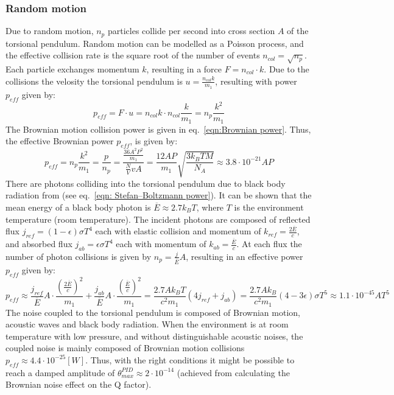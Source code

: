 \documentclass[\main/master.tex]{subfiles}
\begin{document}
\subsubsection{Random motion}
Due to random motion, $n_p$ particles collide per second into cross section $A$ of the torsional pendulum. Random motion can be modelled as a Poisson process, and the effective collision rate is the square root of the number of events $n_{col} = \sqrt{n_p}$. Each particle exchanges momentum $k$, resulting in a force $F = n_{col}\cdot k$. Due to the collisions the velosity the torsional pendulum is $ u = \frac{n_{col}k}{m_1}$, resulting with power $p_{eff}$ given by:
\begin{equation}
p_{eff} = F\cdot u =  n_{col}k \cdot n_{col}\frac{k}{m_1} =  n_p\frac{ k^2}{m_1}
\label{eqn:net power}
\end{equation}
The Brownian motion collision power is given in eq.~\ref{eqn:Brownian power}. Thus, the effective Brownian power $p_{eff}$, is given by:
\begin{equation}
p_{eff} =  n_p\frac{ k^2}{m_1} = \frac{p}{n_p} = \frac{\frac{36A^2P^2}{m_1}}{\frac{N}{V}v A} = \frac{12AP}{m_1}\sqrt{\frac{3 k_B T M}{ N_A }}\approx 3.8\cdot 10^{-21}AP
\label{eqn:Brownian net power}
\end{equation}
There are photons colliding into the torsional pendulum due to black body radiation from (see eq.~\ref{eqn: Stefan–Boltzmann power}). It can be shown that the mean energy of a black body photon is $\overline{E}\approx 2.7k_B T$, where $T$ is the environment temperature (room temperature). The incident photons are composed of reflected flux $j_{ref}=(1-\epsilon)\sigma T^4$ each with elastic collision and momentum of $k_{ref} = \frac{2\overline{E}}{c} $, and absorbed flux $j_{ab}=\epsilon\sigma T^4$ each with momentum of $k_{ab} = \frac{\overline{E}}{c}$. At each flux the number of photon collisions is given by $n_p = \frac{j}{\overline{E}}A$, resulting in an effective power $p_{eff}$ given by:
\begin{equation}
p_{eff}  \approx \frac{j_{ref}}{\overline{E}}A\cdot\frac{ (\frac{2\overline{E}}{c})^2}{m_1} +\frac{j_{ab}}{\overline{E}}A\cdot\frac{ (\frac{\overline{E}}{c})^2}{m_1} = \frac{  2.7 A k_B T }{ c^2 m_1} (4j_{ref}+j_{ab}) =\frac{2.7A k_B}{ c^2 m_1} (4-3\epsilon)\sigma T^5 \approx 1.1\cdot 10^{-45}AT^5
\label{eqn:photon collision power}
\end{equation}
The noise coupled to the torsional pendulum is composed of Brownian motion, acoustic waves and black body radiation. When the environment is at room temperature with low pressure, and without distinguishable acoustic noises, the coupled noise is mainly composed of Brownian motion collisions $p_{eff}\approx 4.4\cdot 10^{-25}  [W]$. Thus, with the right conditions it might be possible to reach a damped amplitude of $\theta_{max}^{PID}\approx 2\cdot 10^{-14}$ (achieved from calculating the Brownian noise effect on the Q factor).
\end{document}
